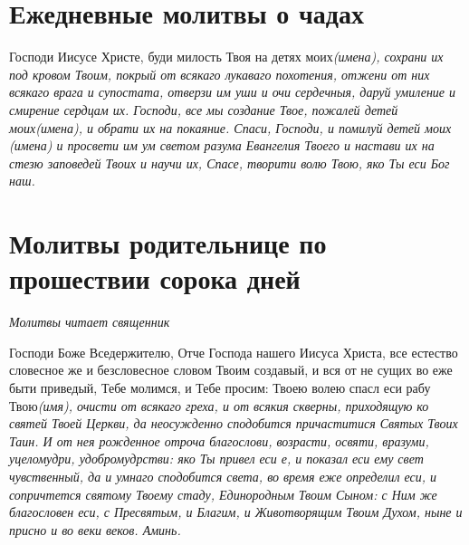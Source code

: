 \section{Ежедневные молитвы о чадах}\begin{mymulticols}



Господи Иисусе Христе, буди милость Твоя на детях моих\itshape  (имена)\normalfont{}, сохрани их под кровом Твоим, покрый от всякаго лукаваго похотения, отжени от них всякаго врага и супостата, отверзи им уши и очи сердечныя, даруй умиление и смирение сердцам их. Господи, все мы создание Твое, пожалей детей моих\itshape  (имена)\normalfont{}, и обрати их на покаяние. Спаси, Господи, и помилуй детей мои\itshape х (имена\normalfont{}) и просвети им ум светом разума Евангелия Твоего и настави их на стезю заповедей Твоих и научи их, Спасе, творити волю Твою, яко Ты еси Бог наш.


\end{mymulticols}

\section{Молитвы родительнице по прошествии сорока дней}\begin{mymulticols}



\itshape Молитвы читает священник\normalfont{}

Господи Боже Вседержителю, Отче Господа нашего Иисуса Христа, все естество словесное же и безсловесное словом Твоим создавый, и вся от не сущих во еже быти приведый, Тебе молимся, и Тебе просим: Твоею волею спасл еси рабу Твою\itshape  (имя\normalfont{}), очисти от всякаго греха, и от всякия скверны, приходящую ко святей Твоей Церкви, да неосужденно сподобится причаститися Святых Твоих Таин. И от нея рожденное отроча благослови, возрасти, освяти, вразуми, уцеломудри, удобромудрстви: яко Ты привел еси е, и показал еси ему свет чувственный, да и умнаго сподобится света, во время еже определил еси, и сопричтется святому Твоему стаду, Единородным Твоим Сыном: с Ним же благословен еси, с Пресвятым, и Благим, и Животворящим Твоим Духом, ныне и присно и во веки веков. Аминь.




\end{mymulticols}

\mychapterending


